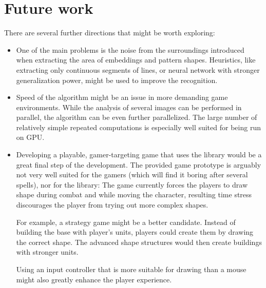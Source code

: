 \section{Future work}
There are several further directions that might be worth exploring:
\begin{itemize}
\item One of the main problems is the noise from the surroundings introduced when extracting the area of embeddings and pattern shapes. Heuristics, like extracting only continuous segments of lines, or neural network with stronger generalization power, might be used to improve the recognition.

\item Speed  of the algorithm might be an issue in more demanding game environments. While  the analysis of several images can be performed in parallel, the algorithm can be even further parallelized. The large number of relatively simple repeated computations is especially well suited for being run on GPU.

\item Developing a playable, gamer-targeting game that uses the library would be a great final step of the development. The provided game prototype is arguably not very well suited for the gamers (which will find it boring after several spells), nor for the library: The game currently forces the players to draw shape during combat and while moving the character, resulting time stress discourages the player from trying out more complex shapes.

For example, a strategy game might be a better candidate. Instead of building the base with player's units, players could create them by drawing the correct shape. The advanced shape structures would then create buildings with stronger units.

Using an input controller that is more suitable for drawing than a mouse might also greatly enhance the player experience.
\end{itemize}

